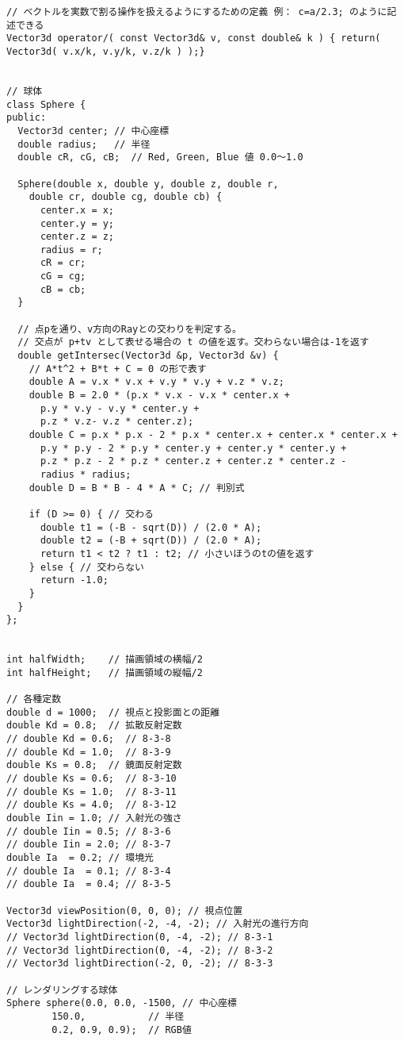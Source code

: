 \documentclass{scrartcl}
\begin{document}
\begin{verbatim}
// ベクトルを実数で割る操作を扱えるようにするための定義 例： c=a/2.3; のように記述できる
Vector3d operator/( const Vector3d& v, const double& k ) { return( Vector3d( v.x/k, v.y/k, v.z/k ) );}


// 球体
class Sphere {
public:
  Vector3d center; // 中心座標
  double radius;   // 半径
  double cR, cG, cB;  // Red, Green, Blue 値 0.0〜1.0

  Sphere(double x, double y, double z, double r,
    double cr, double cg, double cb) {
      center.x = x;
      center.y = y;
      center.z = z;
      radius = r;
      cR = cr;
      cG = cg;
      cB = cb;
  }

  // 点pを通り、v方向のRayとの交わりを判定する。
  // 交点が p+tv として表せる場合の t の値を返す。交わらない場合は-1を返す
  double getIntersec(Vector3d &p, Vector3d &v) {
    // A*t^2 + B*t + C = 0 の形で表す
    double A = v.x * v.x + v.y * v.y + v.z * v.z;
    double B = 2.0 * (p.x * v.x - v.x * center.x +
      p.y * v.y - v.y * center.y +
      p.z * v.z- v.z * center.z);
    double C = p.x * p.x - 2 * p.x * center.x + center.x * center.x +
      p.y * p.y - 2 * p.y * center.y + center.y * center.y +
      p.z * p.z - 2 * p.z * center.z + center.z * center.z -
      radius * radius;
    double D = B * B - 4 * A * C; // 判別式

    if (D >= 0) { // 交わる
      double t1 = (-B - sqrt(D)) / (2.0 * A);
      double t2 = (-B + sqrt(D)) / (2.0 * A);
      return t1 < t2 ? t1 : t2; // 小さいほうのtの値を返す
    } else { // 交わらない
      return -1.0;
    }
  }
};


int halfWidth;    // 描画領域の横幅/2
int halfHeight;   // 描画領域の縦幅/2

// 各種定数
double d = 1000;  // 視点と投影面との距離
double Kd = 0.8;  // 拡散反射定数
// double Kd = 0.6;  // 8-3-8
// double Kd = 1.0;  // 8-3-9
double Ks = 0.8;  // 鏡面反射定数
// double Ks = 0.6;  // 8-3-10
// double Ks = 1.0;  // 8-3-11
// double Ks = 4.0;  // 8-3-12
double Iin = 1.0; // 入射光の強さ
// double Iin = 0.5; // 8-3-6
// double Iin = 2.0; // 8-3-7
double Ia  = 0.2; // 環境光
// double Ia  = 0.1; // 8-3-4
// double Ia  = 0.4; // 8-3-5

Vector3d viewPosition(0, 0, 0); // 視点位置
Vector3d lightDirection(-2, -4, -2); // 入射光の進行方向
// Vector3d lightDirection(0, -4, -2); // 8-3-1
// Vector3d lightDirection(0, -4, -2); // 8-3-2
// Vector3d lightDirection(-2, 0, -2); // 8-3-3

// レンダリングする球体
Sphere sphere(0.0, 0.0, -1500, // 中心座標
        150.0,           // 半径
        0.2, 0.9, 0.9);  // RGB値



\end{verbatim}
\end{document}
